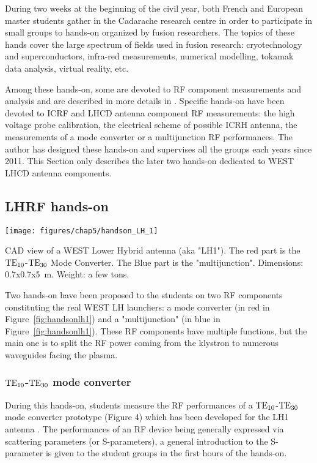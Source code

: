 During two weeks at the beginning of the civil year, both French and European master students gather in the Cadarache research centre in order to participate in small groups to hands-on organized by fusion researchers. The topics of these hands cover the large spectrum of fields used in fusion research: cryotechnology and superconductors, infra-red measurements, numerical modelling, tokamak data analysis, virtual reality, etc. 

Among these hands-on, some are devoted to RF component measurements and analysis and are described in more details in . Specific hands-on have been devoted to ICRF and LHCD antenna component RF measurements: the high voltage probe calibration, the electrical scheme of possible ICRH antenna, the measurements of a mode converter or a multijunction RF performances. The author has designed these hands-on and supervises all the groups each years since 2011. This Section only describes the later two hands-on dedicated to WEST LHCD antenna components. 

\subsection{LHRF hands-on}

\begin{marginfigure}
	\centering
	\texttt{[image: figures/chap5/handson\_LH\_1]}
	\caption{CAD view of a WEST Lower Hybrid antenna (aka "LH1"). The red part is the ${\mathrm{TE}}_{10}$-${\mathrm{TE}}_{30}$ Mode Converter. The Blue part is the "multijunction". Dimensions: 0.7x0.7x5~m. Weight: a few tons. }
	\label{fig:handsonlh1}
\end{marginfigure}

Two hands-on have been proposed to the students on two RF components constituting the real WEST LH launchers: a mode converter (in red in Figure~\ref{fig:handsonlh1}) and a "multijunction" (in blue in Figure~\ref{fig:handsonlh1}). These RF components have multiple functions, but the main one is to split the RF power coming from the klystron to numerous waveguides facing the plasma. 

\subsubsection{${\mathrm{TE}}_{10}$-${\mathrm{TE}}_{30}$ mode converter}

During this hands-on, students measure the RF performances of a ${\mathrm{TE}}_{10}$-${\mathrm{TE}}_{30}$ mode converter prototype (Figure 4) which has been developed for the LH1 antenna . The performances of an RF device being generally expressed via scattering parameters (or S-parameters), a general introduction to the S-parameter is given to the student groups in the first hours of the hands-on. 

